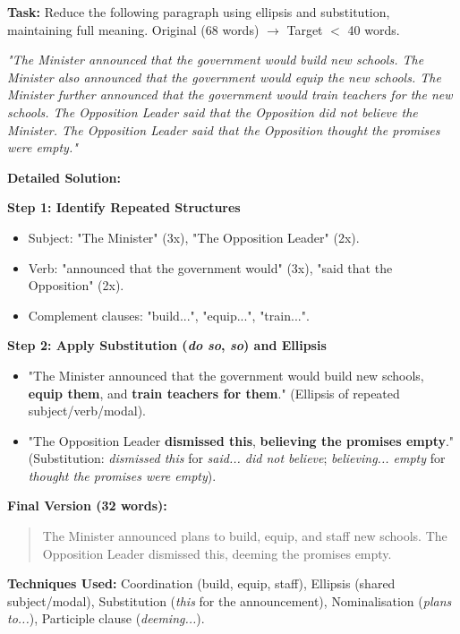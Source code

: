 \documentclass[11pt]{article}
\newcommand{\cle}[1]{{\popxbold\color{popdark}#1}}
\begin{document}
\begin{exoresolu}
\textbf{Task:} Reduce the following paragraph using ellipsis and substitution, maintaining full meaning. Original (68 words) $\rightarrow$ Target $<$ 40 words.

\textit{"The Minister announced that the government would build new schools. The Minister also announced that the government would equip the new schools. The Minister further announced that the government would train teachers for the new schools. The Opposition Leader said that the Opposition did not believe the Minister. The Opposition Leader said that the Opposition thought the promises were empty."}

\tcblower
\textbf{Detailed Solution:}

\textbf{Step 1: Identify Repeated Structures}
\begin{itemize}
    \item Subject: "The Minister" (3x), "The Opposition Leader" (2x).
    \item Verb: "announced that the government would" (3x), "said that the Opposition" (2x).
    \item Complement clauses: "build...", "equip...", "train...".
\end{itemize}

\textbf{Step 2: Apply Substitution (\textit{do so}, \textit{so}) and Ellipsis}
\begin{itemize}
    \item "The Minister announced that the government would build new schools, \textbf{equip them}, and \textbf{train teachers for them}." (Ellipsis of repeated subject/verb/modal).
    \item "The Opposition Leader \textbf{dismissed this}, \textbf{believing the promises empty}." (Substitution: \textit{dismissed this} for \textit{said... did not believe}; \textit{believing... empty} for \textit{thought the promises were empty}).
\end{itemize}

\textbf{Final Version (32 words):}
\begin{quote}
The Minister announced plans to build, equip, and staff new schools. The Opposition Leader dismissed this, deeming the promises empty.
\end{quote}

\textbf{Techniques Used:} \cle{Coordination} (build, equip, staff), \cle{Ellipsis} (shared subject/modal), \cle{Substitution} (\textit{this} for the announcement), \cle{Nominalisation} (\textit{plans to...}), \cle{Participle clause} (\textit{deeming...}).
\end{exoresolu}
\end{document}
